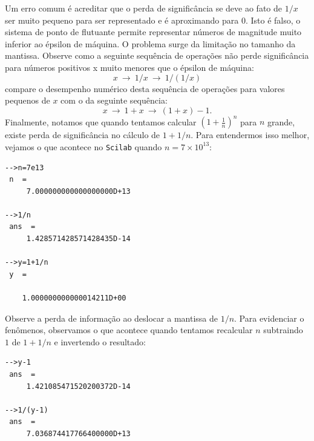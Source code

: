 \documentclass[main.tex]{subfiles}
\begin{document}
Um erro comum é acreditar que o perda de significância se deve ao fato de $1/x$ ser muito pequeno para ser representado e é aproximando para $0$. Isto é falso, o sistema de ponto de flutuante permite representar números de magnitude muito inferior ao épsilon de máquina. O problema surge da limitação no tamanho da mantissa. Observe como a seguinte sequência de operações não perde significância para números positivos x muito menores que o épsilon de máquina:
\begin{equation}\label{seq_oper2}
x ~\to ~1/x ~\to ~1/(1/x) 
\end{equation}
 compare o desempenho numérico desta sequência de operações para valores pequenos de $x$ com o da seguinte sequência:
\begin{equation}\label{seq_oper3}
x ~\to ~1+x ~\to ~(1+x)-1.
\end{equation}
Finalmente, notamos que quando tentamos calcular $\left(1+\frac{1}{n}\right)^n$ para $n$ grande, existe perda de significância no cálculo de $1+1/n$. 
\ifisscilab
Para entendermos isso melhor, vejamos o que acontece no \verb+Scilab+ quando $n=7\times 10^{13}$:
\begin{verbatim}
-->n=7e13
 n  =
     7.000000000000000000D+13  
 
-->1/n
 ans  =
     1.428571428571428435D-14  
 
-->y=1+1/n
 y  =
 
    1.000000000000014211D+00  
\end{verbatim}
Observe a perda de informação ao deslocar a mantissa de $1/n$. Para evidenciar o fenômenos, observamos o que acontece quando tentamos recalcular $n$ subtraindo $1$ de $1+1/n$ e invertendo o resultado:
\begin{verbatim}
-->y-1
 ans  =
     1.421085471520200372D-14  
 
-->1/(y-1)
 ans  =
     7.036874417766400000D+13  
\end{verbatim}
\fi
\end{document}
